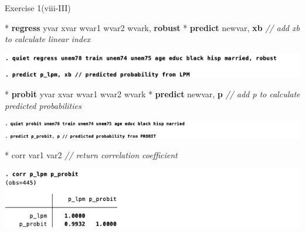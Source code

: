 \documentclass[
  10pt,
  ignorenonframetext,
]{beamer}
\newenvironment{Shaded}{\begin{snugshade}}{\end{snugshade}}
\newcommand{\CommentTok}[1]{\textcolor[rgb]{0.56,0.35,0.01}{\textit{#1}}}
\newcommand{\FunctionTok}[1]{\textcolor[rgb]{0.00,0.00,0.00}{#1}}
\newcommand{\KeywordTok}[1]{\textcolor[rgb]{0.13,0.29,0.53}{\textbf{#1}}}
\newcommand{\NormalTok}[1]{#1}
\begin{document}
\begin{frame}[fragile]{Exercise 1(viii-III)}
\protect\hypertarget{Modelswithcontrols_predict}{}
\footnotesize

\begin{Shaded}
\begin{Highlighting}[]
\NormalTok{* }\KeywordTok{regress}\NormalTok{ yvar xvar wvar1 wvar2 wvark, }\KeywordTok{robust}
\NormalTok{* }\KeywordTok{predict}\NormalTok{ newvar, }\KeywordTok{xb} \CommentTok{// add \textquotesingle{}xb\textquotesingle{} to calculate linear index}
\end{Highlighting}
\end{Shaded}

\begin{center}\includegraphics[width=0.9\linewidth]{pictures/LMPwithcontrols_predict} \end{center}

\footnotesize

\begin{Shaded}
\begin{Highlighting}[]
\NormalTok{* }\KeywordTok{probit}\NormalTok{ yvar xvar wvar1 wvar2 wvark}
\NormalTok{* }\KeywordTok{predict}\NormalTok{ newvar, }\KeywordTok{p} \CommentTok{// add \textquotesingle{}p\textquotesingle{} to calculate predicted probabilities}
\end{Highlighting}
\end{Shaded}

\begin{center}\includegraphics[width=0.9\linewidth]{pictures/PROBITwithcontrols_predict} \end{center}

\footnotesize

\begin{Shaded}
\begin{Highlighting}[]
\NormalTok{* }\FunctionTok{corr}\NormalTok{ var1 var2 }\CommentTok{// return correlation coefficient}
\end{Highlighting}
\end{Shaded}

\begin{center}\includegraphics[width=0.9\linewidth]{pictures/corr2predictedvalues} \end{center}
\end{frame}
\end{document}
